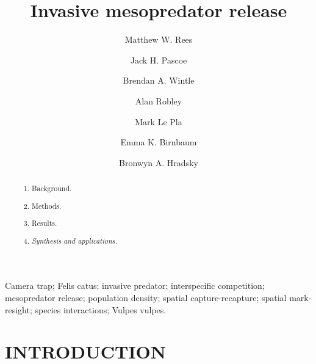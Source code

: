 \documentclass[]{elsarticle} %
\begin{document}
\begin{frontmatter}

  \title{Invasive mesopredator release}
    \author[UOM]{Matthew W. Rees}
    \author[CEC]{Jack H. Pascoe}
  
    \author[UOM]{Brendan A. Wintle}
  
    \author[ARI]{Alan Robley}
  
    \author[CEC]{Mark Le Pla}
  
    \author[CEC]{Emma K. Birnbaum}
  
    \author[UOM]{Bronwyn A. Hradsky}
  
      \address[UOM]{Quantitative \& Applied Ecology Group, School of Ecosystem and Forest Science, The University of Melbourne, Parkville, VIC, Australia}
    \address[CEC]{Conservation Ecology Centre, Otway Lighthouse Rd, Cape Otway, VIC, Australia}
    \address[ARI]{Department of Environment, Land, Water and Planning, Arthur Rylah Institute for Environmental Research, Heidelberg, Australia}
  
  \begin{abstract}
  \begin{enumerate}
  \def\labelenumi{\arabic{enumi}.}
  \item
    Background.
  \item
    Methods.
  \item
    Results.
  \item
    \emph{Synthesis and applications.}
  \end{enumerate}
  \end{abstract}
   \begin{keyword} Camera trap; Felis catus; invasive predator; interspecific competition; mesopredator release; population density; spatial capture-recapture; spatial mark-resight; species interactions; Vulpes vulpes.\end{keyword}
 \end{frontmatter}

\parskip=12pt

\newpage

\hypertarget{introduction}{%
\section{INTRODUCTION}\label{introduction}}
\end{document}
